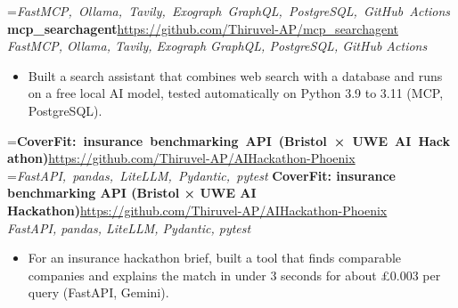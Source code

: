 \documentclass[a4paper,11pt]{article}
\newcommand{\project}[3]{%
  \textbf{#1}\hfill#3\\ {\color{muted}\small\textit{#2}}\par}
\newcommand{\gap}{\vspace{5pt}}
\begin{document}
=\hbox{{\small\textit{FastMCP, Ollama, Tavily, Exograph GraphQL, PostgreSQL, GitHub Actions}}}%
\ifdim\wd0>\linewidth
\ifdim\wd2>\linewidth
\textbf{mcp\_searchagent}\\ {\color{muted}\small\textit{FastMCP, Ollama, Tavily, Exograph GraphQL, PostgreSQL, GitHub Actions}}\\ \hspace*{\fill}{\small\url{https://github.com/Thiruvel-AP/mcp_searchagent}}\par
\else
\textbf{mcp\_searchagent}\\ {\color{muted}\small\textit{FastMCP, Ollama, Tavily, Exograph GraphQL, PostgreSQL, GitHub Actions}}\hfill{\small\url{https://github.com/Thiruvel-AP/mcp_searchagent}}\par
\fi
\else
\project{mcp\_searchagent}{FastMCP, Ollama, Tavily, Exograph GraphQL, PostgreSQL, GitHub Actions}{\url{https://github.com/Thiruvel-AP/mcp_searchagent}}
\fi
\begin{itemize}
  \item Built a search assistant that combines web search with a database and runs on a free local AI model, tested automatically on Python 3.9 to 3.11 (MCP, PostgreSQL).
\end{itemize}
\gap
{}
=\hbox{\textbf{CoverFit: insurance benchmarking API (Bristol × UWE AI Hackathon)}\hspace{1em}\url{https://github.com/Thiruvel-AP/AIHackathon-Phoenix}}%
=\hbox{{\small\textit{FastAPI, pandas, LiteLLM, Pydantic, pytest}}}%
\ifdim\wd0>\linewidth
\ifdim\wd2>\linewidth
\textbf{CoverFit: insurance benchmarking API (Bristol × UWE AI Hackathon)}\\ {\color{muted}\small\textit{FastAPI, pandas, LiteLLM, Pydantic, pytest}}\\ \hspace*{\fill}{\small\url{https://github.com/Thiruvel-AP/AIHackathon-Phoenix}}\par
\else
\textbf{CoverFit: insurance benchmarking API (Bristol × UWE AI Hackathon)}\\ {\color{muted}\small\textit{FastAPI, pandas, LiteLLM, Pydantic, pytest}}\hfill{\small\url{https://github.com/Thiruvel-AP/AIHackathon-Phoenix}}\par
\fi
\else
\project{CoverFit: insurance benchmarking API (Bristol × UWE AI Hackathon)}{FastAPI, pandas, LiteLLM, Pydantic, pytest}{\url{https://github.com/Thiruvel-AP/AIHackathon-Phoenix}}
\fi
\begin{itemize}
  \item For an insurance hackathon brief, built a tool that finds comparable companies and explains the match in under 3 seconds for about £0.003 per query (FastAPI, Gemini).
\end{itemize}
\end{document}
